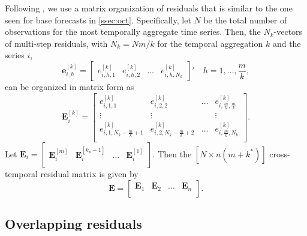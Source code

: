 \documentclass[a4paper,11pt]{article}
\newcommand{\evet}{\bm{e}}
\newcommand{\Evet}{\bm{E}}
\theoremstyle{definition}
\begin{document}
Following \cite{difonzo2023}, we use a matrix organization of residuals that is similar to the one seen for base forecasts in \autoref{ssec:oct}. Specifically, let $N$ be the total number of observations for the most temporally aggregate time series. Then, the $N_k$-vectors of multi-step residuals, with $N_k = Nm/k$ for the temporal aggregation $k$ and the series $i$,
$$
	\evet_{i,h}^{[k]} = \begin{bmatrix}
		e_{i,h,1}^{[k]} & e_{i,h,2}^{[k]} & \dots & e_{i,h,N_k}^{[k]}
	\end{bmatrix}' \quad h = 1,\dots, \frac{m}{k},
$$
can be organized in matrix form as
\begin{equation}\label{eq:Evetki}
	\Evet_i^{[k]} = \begin{bmatrix}
		e_{i,1,1}^{[k]}                     & e_{i,2,2}^{[k]}                     & \dots & e_{i,\frac{m}{k},\frac{m}{k}}^{[k]} \\
		\vdots                            & \vdots                            &       & \vdots                  \\
		e_{i,1,N_k - \frac{m}{k} + 1}^{[k]} & e_{i,2,N_k - \frac{m}{k} + 2}^{[k]} & \dots & e_{i,\frac{m}{k},N_k}^{[k]}         \\
	\end{bmatrix}.
\end{equation}
Let $\Evet_i = \begin{bmatrix}
		\Evet_i^{[m]} & \Evet_i^{[k_p-1]} & \dots & \Evet_i^{[1]} \\
	\end{bmatrix}$. Then the $[N \times n(m+k^\ast)]$ cross-temporal residual matrix is given by
\begin{equation}
	\label{eq:Emat}
	\Evet = \begin{bmatrix}
		\Evet_1 & \Evet_2 & \dots & \Evet_n \\
	\end{bmatrix}.
\end{equation}

\subsection{Overlapping residuals}\label{ssec:over_res}
\end{document}
